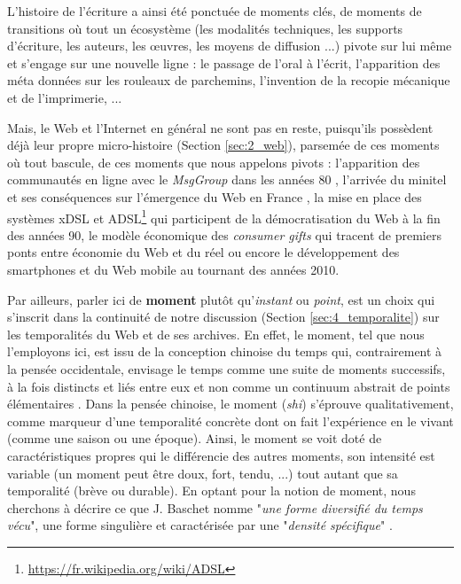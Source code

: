 \documentclass[symmetric,justified,marginals=raggedouter]{tufte-book}
\begin{document}
L'histoire de l'écriture a ainsi été ponctuée de moments clés, de moments de transitions \citep{febvre_apparition_2013} où tout un écosystème (les modalités techniques, les supports d'écriture, les auteurs, les œuvres, les moyens de diffusion ...) pivote sur lui même et s'engage sur une nouvelle ligne : le passage de l'oral à l'écrit, l'apparition des méta données sur les rouleaux de parchemins, l'invention de la recopie mécanique et de l'imprimerie, ... 

Mais, le Web et l'Internet en général ne sont pas en reste, puisqu'ils possèdent déjà leur propre micro-histoire (Section \ref{sec:2_web}), parsemée de ces moments où tout bascule, de ces moments que nous appelons pivots : l'apparition des communautés en ligne avec le \textit{MsgGroup} dans les années 80 \citep[p.218]{hafner_where_1998}, l'arrivée du minitel et ses conséquences sur l'émergence du Web en France \citep{schafer_minitel._2012}, la mise en place des systèmes xDSL et ADSL\footnote{\url{https://fr.wikipedia.org/wiki/ADSL}} qui participent de la démocratisation du Web à la fin des années 90, le modèle économique des \textit{consumer gifts} \citep{giesler_consumer_2006} qui tracent de premiers ponts entre économie du Web et du réel ou encore le développement des smartphones et du Web mobile au tournant des années 2010. 

Par ailleurs, parler ici de \textbf{moment} plutôt qu'\textit{in\-stant} ou \textit{point}, est un choix qui s'inscrit dans la continuité de notre discussion (Section \ref{sec:4_temporalite}) sur les temporalités du Web et de ses archives. En effet, le moment, tel que nous l'employons ici, est issu de la conception chinoise du temps qui, contrairement à la pensée occidentale, envisage le temps comme une suite de moments successifs, à la fois distincts et liés entre eux \citep{chen_cerner_2011} et non comme un continuum abstrait de points élémentaires \citep[livre XI, chap. XV, 20, p.~195]{saint_augustin_confessions_1993}. Dans la pensée chinoise, le moment (\textit{shi}) s'éprouve qualitativement, comme marqueur d'une temporalité concrète dont on fait l'expérience en le vivant (comme une saison ou une époque). Ainsi, le moment se voit doté de caractéristiques propres qui le différencie des autres moments, son intensité est variable (un moment peut être doux, fort, tendu, ...) tout autant que sa temporalité (brève ou durable). En optant pour la notion de moment, nous cherchons à décrire ce que J. Baschet nomme "\textit{une forme diversifié du temps vécu}", une forme singulière et caractérisée par une "\textit{densité spécifique}" \citep[p.186]{baschet_defaire_2018}.    
\end{document}

